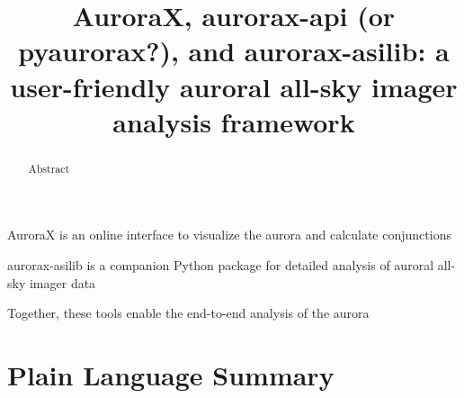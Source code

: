\documentclass[draft]{agujournal2019}
\begin{document}
\title{AuroraX, aurorax-api (or pyaurorax?), and aurorax-asilib: a user-friendly auroral all-sky imager analysis framework}





\begin{keypoints}
\item AuroraX is an online interface to visualize the aurora and calculate conjunctions
\item aurorax-asilib is a companion Python package for detailed analysis of auroral all-sky imager data 
\item Together, these tools enable the end-to-end analysis of the aurora
\end{keypoints}


\begin{abstract}
Abstract
\end{abstract}


\section*{Plain Language Summary}
\noindent
\end{document}
